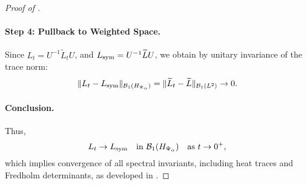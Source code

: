 \begin{proof}[Proof of ]
\paragraph{Step 4: Pullback to Weighted Space.}
Since \( L_t = U^{-1} \widetilde{L}_t U \), and \( L_{\mathrm{sym}} = U^{-1} \widetilde{L} U \), we obtain by unitary invariance of the trace norm:
\[
\| L_t - L_{\mathrm{sym}} \|_{\mathcal{B}_1(H_{\Psi_\alpha})} = \| \widetilde{L}_t - \widetilde{L} \|_{\mathcal{B}_1(L^2)} \to 0.
\]

\paragraph{Conclusion.}
Thus,
\[
L_t \to L_{\mathrm{sym}} \quad \text{in } \mathcal{B}_1(H_{\Psi_\alpha}) \quad \text{as } t \to 0^+,
\]
which implies convergence of all spectral invariants, including heat traces and Fredholm determinants, as developed in .
\end{proof}
